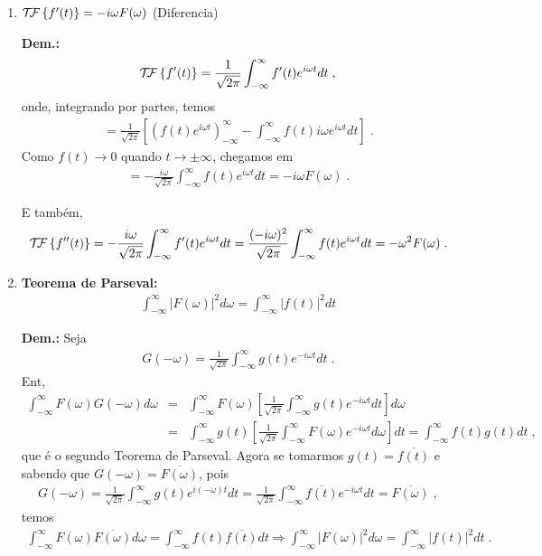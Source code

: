 \begin{enumerate}
\item ${\cal T \kern-2pt F} \left\{ f'(t) \right\} = -i \omega F(\omega)$ (Diferencia\cao)

{\bf Dem.:}
\begin{eqnarray*}
{\cal T \kern-2pt F} \left\{ f'(t) \right\} = \frac{1}{\sqrt{2\pi}} \int_{-\infty}^{\infty} f'(t)
e^{i \omega t} dt \; ,
\end{eqnarray*}
onde, integrando por partes, temos
\begin{eqnarray*}
= \frac{1}{\sqrt{2\pi}} \left[ \left(f(t)
e^{i\omega t}\right)_{-\infty}^{\infty}  -
\int_{-\infty}^{\infty} f(t) i \omega e^{i \omega t} dt \right] \; .
\end{eqnarray*}
Como $f(t) \longrightarrow 0$ quando $t \longrightarrow \pm \infty$,
chegamos em
\begin{eqnarray*}
= -\frac{i\omega}{\sqrt{2\pi}} \int_{-\infty}^{\infty} f(t)
e^{i\omega t} dt = - i\omega F(\omega) \; . 
\end{eqnarray*}

E tamb\'em,
\begin{eqnarray*}
{\cal T \kern-2pt F} \left\{ f''(t) \right\} = -\frac{i\omega}{\sqrt{2\pi}} \int_{-\infty}^{\infty} f'(t)
e^{i\omega t} dt = \frac{(-i\omega)^2}{\sqrt{2\pi}}
\int_{-\infty}^{\infty} f(t) e^{i\omega t} dt = -\omega^2 F(\omega) \; .
\end{eqnarray*}

\item {\bf Teorema de Parseval:} 
\begin{eqnarray*}
\int_{-\infty}^{\infty} |F(\omega)|^2 d\omega =
\int_{-\infty}^{\infty}|f(t)|^2 dt
\end{eqnarray*}

{\bf Dem.: }Seja
\begin{eqnarray*}
G(-\omega) = \frac{1}{\sqrt{2\pi}} \int_{-\infty}^{\infty} g(t)
e^{-i\omega t} dt \; .
\end{eqnarray*}
Ent\ao,
\begin{eqnarray*}
\int_{-\infty}^{\infty} F(\omega)G(-\omega) d\omega &=&
\int_{-\infty}^{\infty} F(\omega) \left[\frac{1}{\sqrt{2\pi}}
\int_{-\infty}^{\infty} g(t) e^{-i\omega t} dt \right] d\omega \\
&=& \int_{-\infty}^{\infty} g(t) \left[\frac{1}{\sqrt{2\pi}}
\int_{-\infty}^{\infty} F(\omega) e^{-i\omega t} d\omega \right] dt
= \int_{-\infty}^{\infty} f(t)g(t) dt \; ,
\end{eqnarray*}
que \'e o segundo Teorema de Parseval. Agora se tomarmos $g(t)=
\overline{f(t)} $ e sabendo que $G(-\omega)=\overline{F(\omega)}$,
pois
\begin{eqnarray*}
G(-\omega) = \frac{1}{\sqrt{2\pi}} \int_{-\infty}^{\infty}
g(t) e^{i(-\omega)t} dt = \frac{1}{\sqrt{2\pi}} \int_{-\infty}^{\infty}
\overline{f(t)} e^{-i \omega t} dt = \overline{F(\omega)} \; ,
\end{eqnarray*}
temos
\begin{eqnarray*}
\int_{-\infty}^{\infty} F(\omega)\overline{F(\omega)} d\omega = 
\int_{-\infty}^{\infty} f(t)\overline{f(t)} dt \Rightarrow
\int_{-\infty}^{\infty} |F(\omega)|^2 d\omega =
\int_{-\infty}^{\infty}|f(t)|^2 dt \; .
\end{eqnarray*}


\end{enumerate}
